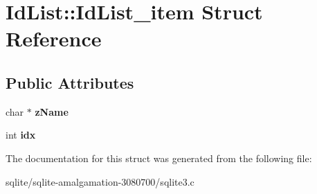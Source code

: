 \hypertarget{struct_id_list_1_1_id_list__item}{\section{Id\+List\+:\+:Id\+List\+\_\+item Struct Reference}
\label{struct_id_list_1_1_id_list__item}
}
\subsection*{Public Attributes}
\begin{DoxyCompactItemize}
\item 
\hypertarget{struct_id_list_1_1_id_list__item_acd44e1182dc46441939cd6a5d935724c}{char $\ast$ {\bfseries z\+Name}}\label{struct_id_list_1_1_id_list__item_acd44e1182dc46441939cd6a5d935724c}

\item 
\hypertarget{struct_id_list_1_1_id_list__item_a869d1a5ee03bcb018e38fae6c9ac0572}{int {\bfseries idx}}\label{struct_id_list_1_1_id_list__item_a869d1a5ee03bcb018e38fae6c9ac0572}

\end{DoxyCompactItemize}


The documentation for this struct was generated from the following file\+:\begin{DoxyCompactItemize}
\item 
sqlite/sqlite-\/amalgamation-\/3080700/sqlite3.\+c\end{DoxyCompactItemize}
